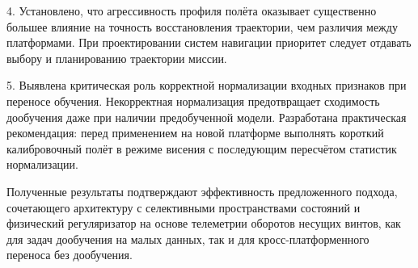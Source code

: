 4. Установлено, что агрессивность профиля полёта оказывает существенно большее влияние на точность восстановления траектории, чем различия между платформами. При проектировании систем навигации приоритет следует отдавать выбору и планированию траектории миссии.

5. Выявлена критическая роль корректной нормализации входных признаков при переносе обучения. Некорректная нормализация предотвращает сходимость дообучения даже при наличии предобученной модели. Разработана практическая рекомендация: перед применением на новой платформе выполнять короткий калибровочный полёт в режиме висения с последующим пересчётом статистик нормализации.

Полученные результаты подтверждают эффективность предложенного подхода, сочетающего архитектуру с селективными пространствами состояний и физический регуляризатор на основе телеметрии оборотов несущих винтов, как для задач дообучения на малых данных, так и для кросс-платформенного переноса без дообучения.